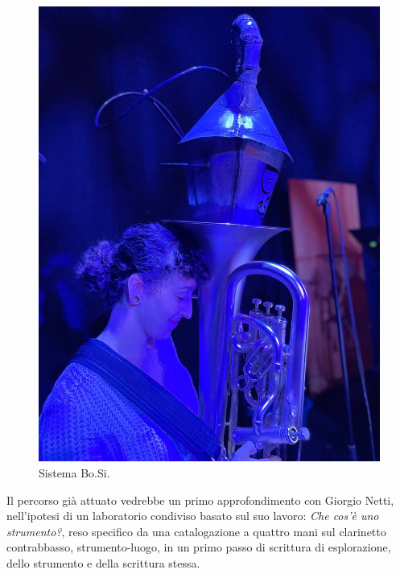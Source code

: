 \documentclass{gs-adonis}
\begin{document}

\begin{figure}[t]
  \centering
  \includegraphics[width=\linewidth]{images/IMG_F5A47D566D6E-31.jpeg}
  \captionsetup{width=.81\linewidth}
  \caption{Sistema Bo.Si.}
  \label{bosi}
\end{figure}

Il percorso già attuato vedrebbe un primo approfondimento con Giorgio Netti,
nell'ipotesi di un laboratorio condiviso basato sul suo lavoro:
\emph{Che cos'è uno strumento?}\cite{netti23}, reso specifico da una catalogazione
a quattro mani sul clarinetto contrabbasso, strumento-luogo, in un primo passo
di scrittura di esplorazione, dello strumento e della scrittura stessa.
\end{document}
